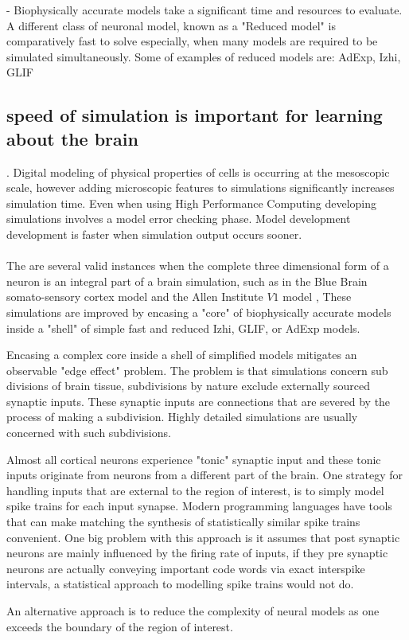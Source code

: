 \documentclass{article}
\begin{document}
\item[-] Biophysically accurate models take a significant time and resources to evaluate. A different class of neuronal model, known as a "Reduced model" is comparatively fast to solve especially, when many models are required to be simulated simultaneously. Some of examples of reduced models are: 
\subitem AdExp, Izhi, GLIF

\subsection*{speed of simulation is important for learning about the brain}. Digital modeling of physical properties of cells is occurring at the mesoscopic scale, however adding microscopic features to simulations significantly increases simulation time. Even when using High Performance Computing developing simulations involves a model error checking phase. Model development development is faster when simulation output occurs sooner.\\
\\
The are several valid instances when the complete three dimensional form of a neuron is an integral part of a brain simulation, such as in the Blue Brain somato-sensory cortex model \cite{} and the Allen Institute $V1$ model \cite{}, These simulations are improved by encasing a "core" of biophysically accurate models inside a "shell" of simple fast and reduced Izhi, GLIF, or AdExp models. 

Encasing a complex core inside a shell of simplified models mitigates an observable "edge effect" problem. The problem is that simulations concern sub divisions of brain tissue, subdivisions by nature exclude externally sourced synaptic inputs. These synaptic inputs are connections that are severed by the process of making a subdivision. Highly detailed simulations are usually concerned with such subdivisions.

\item 
\item Almost all cortical neurons experience "tonic" synaptic input and these tonic inputs originate from neurons from a different part of the brain. One strategy for handling inputs that are external to the region of interest, is to simply model spike trains for each input synapse. Modern programming languages have tools that can make matching the synthesis of statistically similar spike trains convenient. One big problem with this approach is it assumes that post synaptic neurons are mainly influenced by the firing rate of inputs, if they pre synaptic neurons are actually conveying important code words via exact interspike intervals, a statistical approach to modelling spike trains would not do.
\item 
\item  An alternative approach is to reduce the complexity of neural models as one exceeds the boundary of the region of interest.
\end{document}
